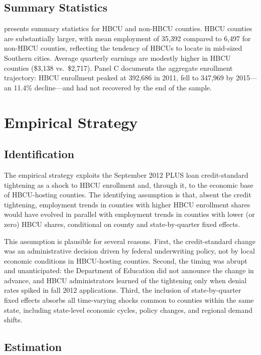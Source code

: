 \documentclass[12pt]{article}
\begin{document}
\subsection{Summary Statistics}

 presents summary statistics for HBCU and non-HBCU counties. HBCU counties are substantially larger, with mean employment of 35{,}392 compared to 6{,}497 for non-HBCU counties, reflecting the tendency of HBCUs to locate in mid-sized Southern cities. Average quarterly earnings are modestly higher in HBCU counties (\$3{,}138 vs.\ \$2{,}717). Panel C documents the aggregate enrollment trajectory: HBCU enrollment peaked at 392{,}686 in 2011, fell to 347{,}969 by 2015---an 11.4\% decline---and had not recovered by the end of the sample.



\section{Empirical Strategy}
\label{sec:strategy}

\subsection{Identification}

The empirical strategy exploits the September 2012 PLUS loan credit-standard tightening as a shock to HBCU enrollment and, through it, to the economic base of HBCU-hosting counties. The identifying assumption is that, absent the credit tightening, employment trends in counties with higher HBCU enrollment shares would have evolved in parallel with employment trends in counties with lower (or zero) HBCU shares, conditional on county and state-by-quarter fixed effects.

This assumption is plausible for several reasons. First, the credit-standard change was an administrative decision driven by federal underwriting policy, not by local economic conditions in HBCU-hosting counties. Second, the timing was abrupt and unanticipated: the Department of Education did not announce the change in advance, and HBCU administrators learned of the tightening only when denial rates spiked in fall 2012 applications. Third, the inclusion of state-by-quarter fixed effects absorbs all time-varying shocks common to counties within the same state, including state-level economic cycles, policy changes, and regional demand shifts.

\subsection{Estimation}
\end{document}

